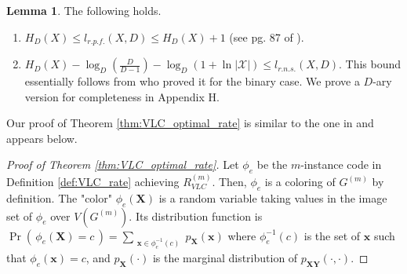 \documentclass[journal, onecolumn, draftcls]{IEEEtran}
\theoremstyle{definition}
\newtheorem{lemma}{Lemma}
\newtheorem{claim}{Claim}
\newcommand{\calX}{\mathcal{X}}
\newcommand{\bfy}{\mathbf{y}}
\newcommand{\bfX}{\mathbf{X}}
\newcommand{\bfY}{\mathbf{Y}}
\newcommand{\bfx}{\mathbf{x}}
\newcommand{\meng}[1]{\marginpar{+}{\bf Ruoyu's remark}: {\em #1}}
\newcommand{\aditya}[1]{\marginpar{+}{\bf Aditya's remark}: {\em #1}}
\begin{document}
\begin{lemma}  The following holds. \label{lemma:11_pf_encoding_bounds}
\begin{enumerate}[label=(\alph*)]
    \item $H_D(X)\le l_{r.p.f.}(X,D)\le H_D(X)+1$ (see pg. 87 of \cite{CoverT05}).\label{lemma:11_pf_encoding_bounds_part_1}
    \item $H_D(X)  - \log_D\left(\frac{D}{D-1}\right) - \log_D(1+\ln |\calX|) \le l_{r.n.s.}(X,D)$. This bound essentially follows from \cite{Dunham80} who proved it for the binary case. We prove a $D$-ary version for completeness in Appendix H.  \label{lemma:11_pf_encoding_bounds_part_2}
\end{enumerate} 

Our proof of Theorem \ref{thm:VLC_optimal_rate} is similar to the one in \cite{AlonO_96} and appears below. %
\begin{proof}[Proof of Theorem \ref{thm:VLC_optimal_rate}] 
    Let $\phi_e$ be the $m$-instance code in Definition \ref{def:VLC_rate} achieving $R^{(m)}_{VLC}$. Then, $\phi_e$ is a coloring of $G^{(m)}$ by definition. The "color" $\phi_e(\bfX)$ is a random variable taking values in the image set of $\phi_e$ over $V(G^{(m)})$. Its  distribution function is   $\Pr (\,\phi_e(\bfX)=c\,) = \sum_{\substack{\bfx\in \phi_e^{-1}(c)}} p_{\bfX}(\bfx)$ where $\phi_e^{-1}(c)$ is the set of $\bfx$ such that $\phi_e (\bfx)=c$, and $p_{\bfX}(\cdot)$ is the marginal distribution of $p_{\bfX\bfY}(\cdot,\cdot)$.
    

\end{proof}
\end{lemma}
\end{document}
